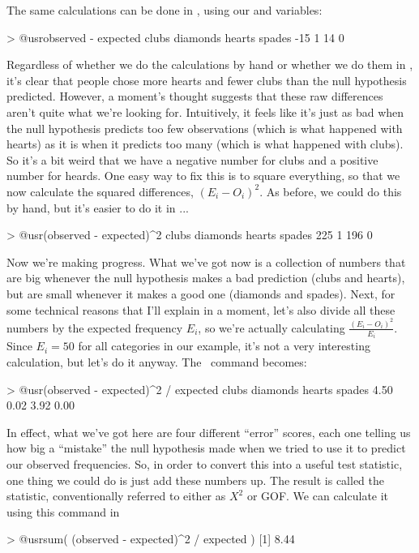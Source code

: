 \noindent
The same calculations can be done in \R, using our  and  variables:
\begin{rblock1}
> @usr{observed - expected} 
   clubs diamonds   hearts   spades 
     -15        1       14        0 
\end{rblock1}
Regardless of whether we do the calculations by hand or whether we do them in \R, it's clear that people chose more hearts and fewer clubs than the null hypothesis predicted. However, a moment's thought suggests that these raw differences aren't quite what we're looking for. Intuitively, it feels like it's just as bad when the null hypothesis predicts too few observations (which is what happened with hearts) as it is when it predicts too many (which is what happened with clubs). So it's a bit weird that we have a negative number for clubs and a positive number for heards. One easy way to fix this is to square everything, so that we now calculate the squared differences, $(E_i - O_i)^2$. As before, we could do this by hand, but it's easier to do it in \R...
\begin{rblock1}
> @usr{(observed - expected)^2}
   clubs diamonds   hearts   spades 
     225        1      196        0 
\end{rblock1}
Now we're making progress. What we've got now is a collection of numbers that are big whenever the null hypothesis makes a bad prediction (clubs and hearts), but are small whenever it makes a good one (diamonds and spades). Next, for some technical reasons that I'll explain in a moment, let's also divide all these numbers by the expected frequency $E_i$, so we're actually calculating $\frac{(E_i-O_i)^2}{E_i}$. Since $E_i = 50$ for all categories in our example, it's not a very interesting calculation, but let's do it anyway. The \R\ command becomes:
\begin{rblock1}
> @usr{(observed - expected)^2 / expected}
   clubs diamonds   hearts   spades 
    4.50     0.02     3.92     0.00 
\end{rblock1}
In effect, what we've got here are four different ``error'' scores, each one telling us how big a ``mistake'' the null hypothesis made when we tried to use it to predict our observed frequencies. So, in order to convert this into a useful test statistic, one thing we could do is just add these numbers up. The result is called the  statistic, conventionally referred to either as $X^2$ or GOF. We can calculate it using this command in \R
\begin{rblock1}
> @usr{sum( (observed - expected)^2 / expected )}
[1] 8.44
\end{rblock1}
